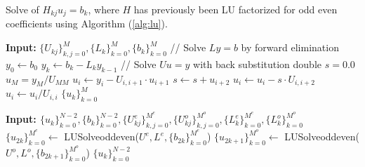 \documentclass[11pt, oneside]{article}
\begin{document}
\begin{algorithm}
\caption{Solve of $H_{kj}u_j = b_k$, where $H$ has previously been LU 
factorized for odd even coefficients using Algorithm (\ref{alg:lu}).}
\label{alg:lusolve}
\begin{algorithmic}[1]
  \State \textbf{Input:} $\{U_{kj}\}_{k,j=0}^{M}, \{L_k\}_{k=0}^{M}, 
\{b_k\}_{k=0}^{M}$ 
  \State // Solve $Ly=b$ by forward elimination 
  \State $y_0 \gets b_0$
    \State $y_k \gets b_k - L_ky_{k-1}$
  \EndFor
  \State // Solve $Uu=y$ with back substitution
  \State double $s = 0.0$     
  \State $u_M = y_M / U_{MM}$    
     \State $u_i \gets y_i - U_{i, i+1}\cdot u_{i+1}$
       \State $s \gets s + u_{i+2}$
       \State $u_i \gets u_i - s\cdot U_{i,i+2}$            
     \EndIf
     \State $u_i \gets  u_i / U_{i,i}$
   \EndFor
  \State \Return $\{u_k\}_{k=0}^{M}$  
\EndProcedure
\end{algorithmic}

\begin{algorithmic}[1]
  \State \textbf{Input: $\{u_k\}_{k=0}^{N-2}, \{b_k\}_{k=0}^{N-2}, 
\{U_{kj}^{e}\}_{k,j=0}^{M^{e}}, \{U_{kj}^{o}\}_{k,j=0}^{M^{o}}, 
\{L^{e}_k\}_{k=0}^{M^{e}}, \{L^{o}_k\}_{k=0}^{M^{o}}$}
  \State $\{u_{2k}\}_{k=0}^{M^e} \gets $ LUSolveoddeven($U^{e}, L^e, 
\{b_{2k}\}_{k=0}^{M^e}$)
  \State $\{u_{2k+1}\}_{k=0}^{M^o} \gets $ LUSolveoddeven($U^{o}, L^o, 
\{b_{2k+1}\}_{k=0}^{M^o}$)
  \State \Return $\{u_k\}_{k=0}^{N-2}$
\EndProcedure
\end{algorithmic}
\end{algorithm}
\end{document}
